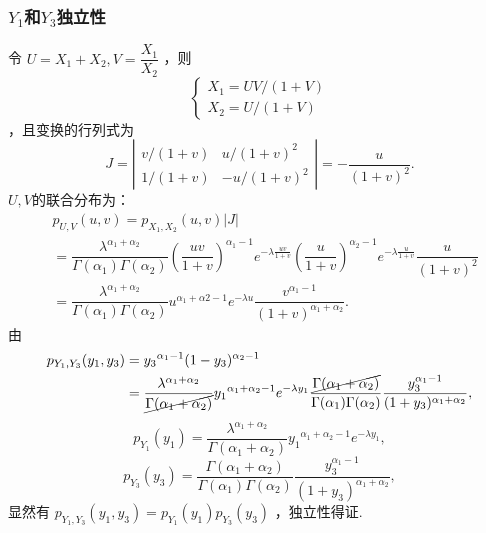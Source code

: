 \begin{frame}[t,allowframebreaks]
    \frametitle{$Y_1$和$Y_3$独立性}
    令 $U=X_1+X_2,V=\dfrac{X_1}{X_2}$ ，则 
    \[
        \left\{ \begin{array}{ll} X_{1}={UV}/{(1+V)} \\ X_{2}={U}/{(1+V)} \end{array}\right.
    \]
    ，且变换的行列式为 
    \[
        J= \left | \begin{array}{ccc} v/(1+v) & u/{(1+v)^2} \\ 1/(1+v) & -u/{(1+v)^2} \end{array} \right |=-\dfrac{u}{(1+v)^2}. 
    \]
    $U,V $的联合分布为：
    \[
        \begin{aligned}
            &p_{U,V}(u,v)=p_{X_1,X_2}(u,v)|J| \\
             &=\dfrac{\lambda^{\alpha_1+\alpha_2}}{\Gamma(\alpha_1)\Gamma(\alpha_2)}\left(\dfrac{uv}{1+v} \right)^{\alpha_1-1}e^{-\lambda \frac{uv}{1+v} } \left(\dfrac{u}{1+v} \right)^{\alpha_2-1}e^{-\lambda \frac{u}{1+v}}\dfrac{u}{(1+v)^2}\\
              &=\dfrac{\lambda^{\alpha_1+\alpha_2}}{\Gamma(\alpha_1)\Gamma(\alpha_2)}u^{\alpha_1+\alpha2-1}e^{-\lambda u } \dfrac{v^{\alpha_1-1}}{(1+v)^{\alpha_1+\alpha_2}}. 
        \end{aligned}
    \]
    由
    \[
        \begin{aligned} p_{Y_1,Y_3}(y_1,y_3)&={y_3}^{\alpha_1-1}(1-y_3)^{\alpha_2-1} \\ &=\dfrac{\lambda^{\alpha_1+\alpha_2}}{\cancel{\Gamma(\alpha_1+\alpha_2)}}{y_1}^{\alpha_1+\alpha_2-1}e^{-\lambda y_1} \dfrac{\cancel{\Gamma(\alpha_1+\alpha_2)}}{\Gamma(\alpha_1)\Gamma(\alpha_2)}\dfrac{y_3^{\alpha_1-1}}{(1+y_3)^{\alpha_1+\alpha_2}}, \end{aligned} 
    \]
    \[
        p_{Y_1}(y_1)=\dfrac{\lambda^{\alpha_1+\alpha_2}}{\Gamma(\alpha_1+\alpha_2)}{y_1}^{\alpha_1+\alpha_2-1}e^{-\lambda y_1},
    \]
    \[
        p_{Y_3}(y_3)=\dfrac{\Gamma(\alpha_1+\alpha_2)}{\Gamma(\alpha_1)\Gamma(\alpha_2)}\dfrac{y_3^{\alpha_1-1}}{(1+y_3)^{\alpha_1+\alpha_2}},
    \]
    显然有 $p_{Y_1,Y_3}(y_1,y_3)=p_{Y_1}(y_1)p_{Y_3}(y_3)$ ，独立性得证.
\end{frame}